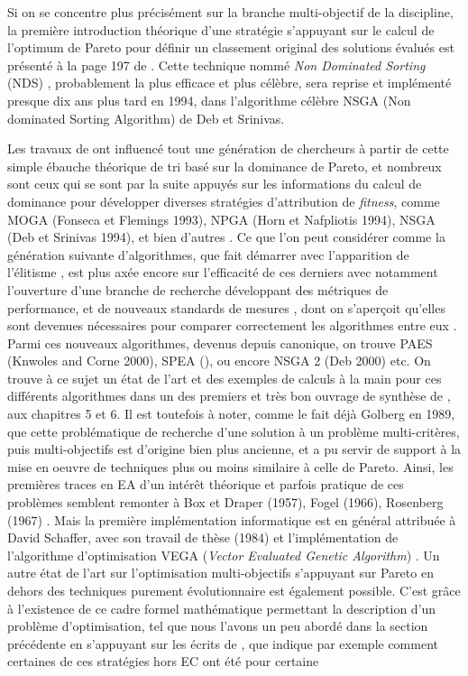 Si on se concentre plus précisément sur la branche multi-objectif de la discipline, la première introduction théorique d'une stratégie s'appuyant sur le calcul de l'optimum de Pareto pour définir un classement original des solutions évalués est présenté à la page 197 de \textcite[197]{Goldberg1989}. Cette technique nommé \textit{Non Dominated Sorting} (NDS) \autocite[40-43]{Deb2001}, probablement la plus efficace et plus célèbre, sera reprise et implémenté presque dix ans plus tard en 1994, dans l'algorithme célèbre NSGA (Non dominated Sorting Algorithm) de Deb et Srinivas.

Les travaux de \textcite{Goldberg1989} ont influencé tout une génération de chercheurs à partir de cette simple ébauche théorique de tri basé sur la dominance de Pareto, et nombreux sont ceux qui se sont par la suite appuyés \autocite[175, 235]{Deb2001} sur les informations du calcul de dominance pour développer diverses stratégies d'attribution de \textit{fitness}, comme MOGA (Fonseca et Flemings 1993), NPGA (Horn et Nafpliotis 1994), NSGA (Deb et Srinivas 1994), et bien d'autres \autocite[14]{Zitzler1999a}. Ce que l'on peut considérer comme la génération suivante d'algorithmes, que \textcite{Coello2006}  fait démarrer avec l'apparition de l'élitisme , est plus axée encore sur l'efficacité de ces derniers avec notamment l'ouverture d'une branche de recherche développant des métriques de performance, et de nouveaux standards de mesures \autocites{Coello2006, Zitzler2003,Huband2006}, dont on s'aperçoit qu'elles sont devenues nécessaires pour comparer correctement les algorithmes entre eux \autocite[14-15]{Zitzler1999a}. Parmi ces nouveaux algorithmes, devenus depuis canonique, on trouve PAES (Knwoles and Corne 2000), SPEA (\autocite{Zitzler1999}), ou encore NSGA 2 (Deb 2000) etc. On trouve à ce sujet un état de l'art et des exemples de calculs à la main pour ces différents algorithmes dans un des premiers et très bon ouvrage de synthèse de \textcite{Deb2001}, aux chapitres 5 et 6. Il est toutefois à noter, comme le fait déjà Golberg en 1989, que cette problématique de recherche d'une solution à un problème multi-critères, puis multi-objectifs est d'origine bien plus ancienne, et a pu servir de support à la mise en oeuvre de techniques plus ou moins similaire à celle de Pareto. Ainsi, les premières traces en EA d'un intérêt théorique et parfois pratique de ces problèmes semblent remonter à Box et Draper (1957), Fogel (1966), Rosenberg (1967) \autocite[174-175]{Deb2001}. Mais la première implémentation informatique est en général attribuée à David Schaffer, avec son travail de thèse (1984) et l'implémentation de l'algorithme d'optimisation VEGA (\textit{Vector Evaluated Genetic Algorithm}) \autocite{Schaffer1985}. Un autre état de l'art sur l'optimisation multi-objectifs s'appuyant sur Pareto en dehors des techniques purement évolutionnaire est également possible. C'est grâce à l'existence de ce cadre formel mathématique permettant la description d'un problème d'optimisation, tel que nous l'avons un peu abordé dans la section précédente en s'appuyant sur les écrits de \autocite{Weise2011}, que \textcite[50-79]{Deb2001} indique par exemple comment certaines de ces stratégies hors EC ont été pour certaine 
